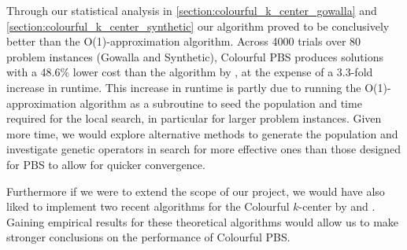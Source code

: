 Through our statistical analysis in \cref{section:colourful_k_center_gowalla} and \cref{section:colourful_k_center_synthetic} our algorithm proved to be conclusively better than the O(1)-approximation algorithm. Across 4000 trials over 80 problem instances (Gowalla and Synthetic), Colourful PBS produces solutions with a 48.6\% lower cost than the algorithm by \citeauthor{bandyapadhyay_constant_2019}, at the expense of a 3.3-fold increase in runtime. This increase in runtime is partly due to running the O(1)-approximation algorithm as a subroutine to seed the population and time required for the local search, in particular for larger problem instances. Given more time, we would explore alternative methods to generate the population and investigate genetic operators in search for more effective ones than those designed for PBS to allow for quicker convergence.

Furthermore if we were to extend the scope of our project, we would have also liked to implement two recent algorithms for the Colourful $k$-center by \textcite{jia_fair_2020} and \textcite{anegg_technique_2020}. Gaining empirical results for these theoretical algorithms would allow us to make stronger conclusions on the performance of Colourful PBS.  